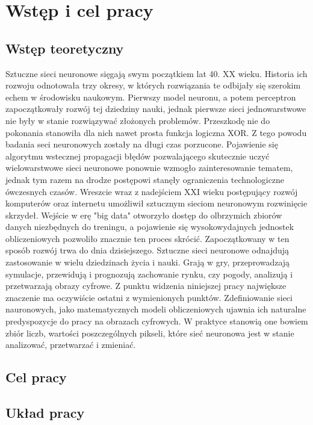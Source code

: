 \section{Wstęp i cel pracy}

  \subsection{Wstęp teoretyczny}
  \tab Sztuczne sieci neuronowe sięgają swym początkiem lat 40. XX wieku. Historia ich rozwoju odnotowała trzy okresy, w których rozwiązania te odbijały się szerokim echem w środowisku naukowym.
  \newline \tab Pierwszy model neuronu, a potem perceptron zapoczątkowały rozwój tej dziedziny nauki, jednak pierwsze sieci jednowarstwowe nie były w stanie rozwiązywać złożonych problemów. Przeszkodę nie do pokonania stanowiła dla nich nawet prosta funkcja logiczna XOR. Z tego powodu badania seci neuronowych zostały na długi czas porzucone.
  \newline \tab Pojawienie się algorytmu wstecznej propagacji błędów pozwalającego skutecznie uczyć wielowarstwowe sieci neuronowe ponownie wzmogło zainteresowanie tematem, jednak tym razem na drodze postępowi stanęły ograniczenia technologiczne ówczesnych czasów.
  \newline \tab Wreszcie wraz z nadejściem XXI wieku postępujący rozwój komputerów oraz internetu umożliwił sztucznym sieciom neuronowym rozwinięcie skrzydeł. Wejście w erę "big data" otworzyło dostęp do olbrzymich zbiorów danych niezbędnych do treningu, a pojawienie się wysokowydajnych jednostek obliczeniowych pozwoliło znacznie ten proces skrócić.
  \newline \tab Zapoczątkowany w ten sposób rozwój trwa do dnia dzisiejszego. Sztuczne sieci neuronowe odnajdują zastosowanie w wielu dziedzinach życia i nauki. Grają w gry, przeprowadzają symulacje, przewidują i prognozują zachowanie rynku, czy pogody, analizują i przetwarzają obrazy cyfrowe.
  \newline \tab Z punktu widzenia niniejszej pracy największe znaczenie ma oczywiście ostatni z wymienionych punktów. Zdefiniowanie sieci nauronowych, jako matematycznych modeli obliczeniowych ujawnia ich naturalne predyspozycje do pracy na obrazach cyfrowych. W praktyce stanowią one bowiem zbiór liczb, wartości poszczególnych pikseli, które sieć neuronowa jest w stanie analizować, przetwarzać i zmieniać.

  \subsection{Cel pracy}

  \subsection{Układ pracy}
